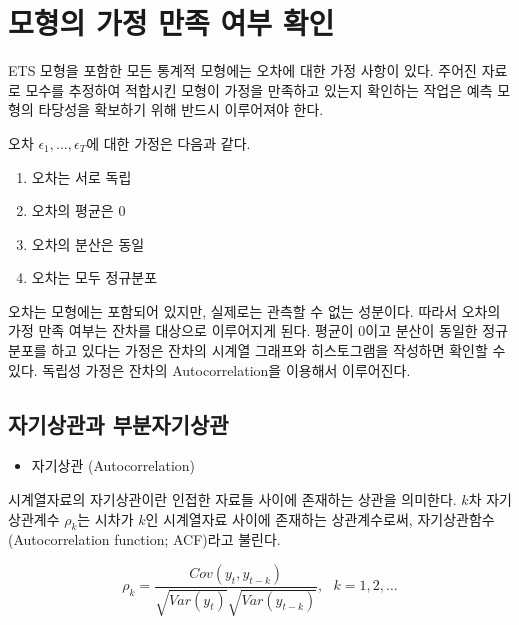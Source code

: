 \documentclass[
]{book}
\providecommand{\tightlist}{%
  \setlength{\itemsep}{0pt}\setlength{\parskip}{0pt}}
\begin{document}
\hypertarget{uxbaa8uxd615uxc758-uxac00uxc815-uxb9ccuxc871-uxc5ecuxbd80-uxd655uxc778}{%
\section{모형의 가정 만족 여부 확인}\label{uxbaa8uxd615uxc758-uxac00uxc815-uxb9ccuxc871-uxc5ecuxbd80-uxd655uxc778}}

ETS 모형을 포함한 모든 통계적 모형에는 오차에 대한 가정 사항이 있다. 주어진 자료로 모수를 추정하여 적합시킨 모형이 가정을 만족하고 있는지 확인하는 작업은 예측 모형의 타당성을 확보하기 위해 반드시 이루어져야 한다.

오차 \(\epsilon_{1}, \ldots ,\epsilon_{T}\)에 대한 가정은 다음과 같다.

\begin{enumerate}
\def\labelenumi{\arabic{enumi}.}
\item
  오차는 서로 독립
\item
  오차의 평균은 0
\item
  오차의 분산은 동일
\item
  오차는 모두 정규분포
\end{enumerate}

오차는 모형에는 포함되어 있지만, 실제로는 관측할 수 없는 성분이다. 따라서 오차의 가정 만족 여부는 잔차를 대상으로 이루어지게 된다. 평균이 0이고 분산이 동일한 정규분포를 하고 있다는 가정은 잔차의 시계열 그래프와 히스토그램을 작성하면 확인할 수 있다. 독립성 가정은 잔차의 Autocorrelation을 이용해서 이루어진다.

\hypertarget{uxc790uxae30uxc0c1uxad00uxacfc-uxbd80uxbd84uxc790uxae30uxc0c1uxad00}{%
\subsection{자기상관과 부분자기상관}\label{uxc790uxae30uxc0c1uxad00uxacfc-uxbd80uxbd84uxc790uxae30uxc0c1uxad00}}

\begin{itemize}
\tightlist
\item
  자기상관 (Autocorrelation)
\end{itemize}

시계열자료의 자기상관이란 인접한 자료들 사이에 존재하는 상관을 의미한다. \(k\)차 자기상관계수 \(\rho_{k}\)는 시차가 \(k\)인 시계열자료 사이에 존재하는 상관계수로써, 자기상관함수 (Autocorrelation function; ACF)라고 불린다.

\[
\rho_{k} = \frac{Cov(y_{t}, y_{t-k})}{\sqrt{Var(y_{t})}\sqrt{Var(y_{t-k})}}, ~~~k=1, 2, \ldots
\]
\end{document}
